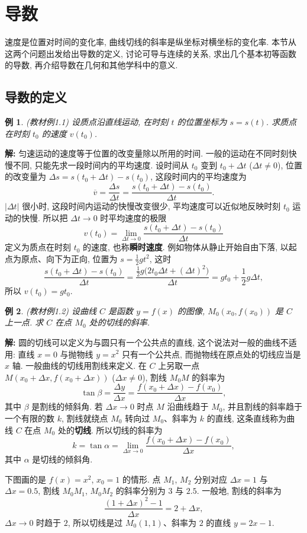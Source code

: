 \documentclass[UTF8,openany]{ctexbook}
\theoremstyle{chinesetextbook}
\newtheorem{example}{例}[section]
\newenvironment{cnsolution}{\par\indent\textbf{解:} \ignorespaces}{\par}
\begin{document}
\section{导数}
速度是位置对时间的变化率, 曲线切线的斜率是纵坐标对横坐标的变化率. 本节从这两个问题出发给出导数的定义, 讨论可导与连续的关系, 求出几个基本初等函数的导数, 再介绍导数在几何和其他学科中的意义.
\subsection{导数的定义}
\begin{example}\label{ex:c2-1-1}
\textnormal{(教材例1.1)} 设质点沿直线运动, 在时刻 $t$ 的位置坐标为 $s=s(t)$. 求质点在时刻 $t_0$ 的速度 $v(t_0)$.
\end{example}
\begin{cnsolution}
匀速运动的速度等于位置的改变量除以所用的时间. 一般的运动在不同时刻快慢不同, 只能先求一段时间内的平均速度. 设时间从 $t_0$ 变到 $t_0+\Delta t$ ($\Delta t\ne0$), 位置的改变量为 $\Delta s=s(t_0+\Delta t)-s(t_0)$, 这段时间内的平均速度为
\[
\overline v=\frac{\Delta s}{\Delta t}=\frac{s(t_0+\Delta t)-s(t_0)}{\Delta t}.
\]
$|\Delta t|$ 很小时, 这段时间内运动的快慢改变很少, 平均速度可以近似地反映时刻 $t_0$ 运动的快慢. 所以把 $\Delta t\to0$ 时平均速度的极限
\[
v(t_0)=\lim_{\Delta t\to0}\frac{s(t_0+\Delta t)-s(t_0)}{\Delta t}
\]
定义为质点在时刻 $t_0$ 的速度, 也称\textbf{瞬时速度}. 例如物体从静止开始自由下落, 以起点为原点、向下为正向, 位置为 $\displaystyle s=\frac12gt^2$, 这时
\[
\frac{s(t_0+\Delta t)-s(t_0)}{\Delta t}=\frac{\frac12g\bigl(2t_0\Delta t+(\Delta t)^2\bigr)}{\Delta t}=gt_0+\frac12g\Delta t,
\]
所以 $v(t_0)=gt_0$.
\end{cnsolution}
\begin{example}\label{ex:c2-1-2}
\textnormal{(教材例1.2)} 设曲线 $C$ 是函数 $y=f(x)$ 的图像, $M_0(x_0,f(x_0))$ 是 $C$ 上一点. 求 $C$ 在点 $M_0$ 处的切线的斜率.
\end{example}
\begin{cnsolution}
圆的切线可以定义为与圆只有一个公共点的直线, 这个说法对一般的曲线不适用: 直线 $x=0$ 与抛物线 $y=x^2$ 只有一个公共点, 而抛物线在原点处的切线应当是 $x$ 轴. 一般曲线的切线用割线来定义. 在 $C$ 上另取一点 $M(x_0+\Delta x,f(x_0+\Delta x))$ ($\Delta x\ne0$), 割线 $M_0M$ 的斜率为
\[
\tan\beta=\frac{\Delta y}{\Delta x}=\frac{f(x_0+\Delta x)-f(x_0)}{\Delta x},
\]
其中 $\beta$ 是割线的倾斜角. 若 $\Delta x\to0$ 时点 $M$ 沿曲线趋于 $M_0$, 并且割线的斜率趋于一个有限的数 $k$, 割线就绕点 $M_0$ 转向过 $M_0$、斜率为 $k$ 的直线, 这条直线称为曲线 $C$ 在点 $M_0$ 处的\textbf{切线}. 所以切线的斜率为
\[
k=\tan\alpha=\lim_{\Delta x\to0}\frac{f(x_0+\Delta x)-f(x_0)}{\Delta x},
\]
其中 $\alpha$ 是切线的倾斜角.

下图画的是 $f(x)=x^2$, $x_0=1$ 的情形. 点 $M_1$, $M_2$ 分别对应 $\Delta x=1$ 与 $\Delta x=0.5$, 割线 $M_0M_1$, $M_0M_2$ 的斜率分别为 $3$ 与 $2.5$. 一般地, 割线的斜率为
\[
\frac{(1+\Delta x)^2-1}{\Delta x}=2+\Delta x,
\]
$\Delta x\to0$ 时趋于 $2$, 所以切线是过 $M_0(1,1)$、斜率为 $2$ 的直线 $y=2x-1$.
\end{cnsolution}
\end{document}
